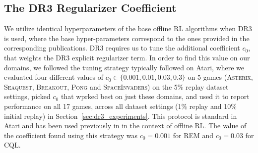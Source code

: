 \subsection{The DR3 Regularizer Coefficient}
\label{app:tuning_dr3}
\vspace{-0.2cm}
We utilize identical hyperparameters of the base offline RL algorithms when DR3 is used, where the base hyper-parameters correspond to the ones provided in the corresponding publications. DR3 requires us to tune the additional coefficient $c_0$, that weights the DR3 explicit regularizer term. In order to find this value on our domains, we followed the tuning strategy typically followed on Atari, where we evaluated four different values of $c_0 \in \{0.001, 0.01, 0.03, 0.3\}$ on 5 games (\textsc{Asterix}, \textsc{Seaquest}, \textsc{Breakout}, \textsc{Pong} and \textsc{SpaceInvaders}) on the 5\% replay dataset settings, picked $c_0$ that wprked best on just these domains, and used it to report performance on all 17 games, across all dataset settings (1\% replay and 10\% initial replay) in Section~\ref{sec:dr3_experiments}. This protocol is standard in Atari and has been used previously in \citet{agarwal2019optimistic,gulcehre2020rl,kumar2021implicit} in the context of offline RL. The value of the coefficient found using this strategy was $c_0 = 0.001$ for REM and $c_0 = 0.03$ for CQL.






